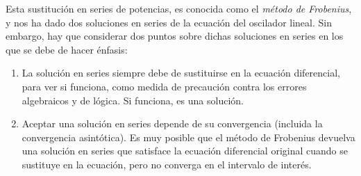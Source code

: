 Esta sustitución en series de potencias, es conocida como el \emph{método de Frobenius}, y nos ha dado dos soluciones en series de la ecuación del oscilador lineal. Sin embargo, hay que considerar dos puntos sobre dichas soluciones en series en los que se debe de hacer énfasis:
\begin{enumerate}
\item La solución en series siempre debe de sustituirse en la ecuación diferencial, para ver si funciona, como medida de precaución contra los errores algebraicos y de lógica. Si funciona, es una solución.
\item Aceptar una solución en series depende de su convergencia (incluida la convergencia asintótica). Es muy posible que el método de Frobenius devuelva una solución en series que satisface la ecuación diferencial original cuando se sustituye en la ecuación, pero no converga en el intervalo de interés.
\end{enumerate}
